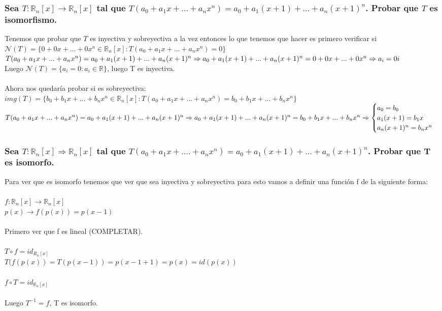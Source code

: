 \documentclass{article}
\begin{document}
\begin{enumerate}[a.]
\end{enumerate}

\subsubsection{Sea $T: \mathbb{R}_n[x] \rightarrow \mathbb{R}_n[x]$ tal que $T(a_0+a_1x+...+a_nx^n) = a_0 +
a_1(x+1)+...+a_n(x+1)^n$. Probar que $T$ es isomorfismo.}
Tenemos que probar que $T$ es inyectiva y sobreyectiva a la vez entonces lo que tenemos que hacer
es primero verificar si
\\
$\mathcal{N}(T) = \{ 0+0x+...+0x^n \in \mathbb{R}_n[x] : T(a_0+a_1x+...+a_nx^n) = 0 \}$ \\
$T(a_0+a_1x+...+a_nx^n) = a_0+a_1(x+1)+...+a_n(x+1)^n \Rightarrow a_0+a_1(x+1)+...+a_n(x+1)^n = 0+0x+...+0x^n
\\ \Rightarrow a_i = 0i$
\\ Luego $\mathcal{N}(T) = \{ a_i = 0 : a_i \in \mathbb{R} \}$, luego T es inyectiva. \\ 
\\ Ahora nos quedaría probar si es sobreyectiva: \\  
$img(T) = \{ b_0+b_1x+...+b_nx^n \in \mathbb{R}_n[x] : T(a_0+a_1x+...+a_nx^n) = b_0+b_1x+...+b_nx^n \}$
\\ $T(a_0+a_1x+...+a_nx^n) = a_0+a_1(x+1)+...+a_n(x+1)^n \Rightarrow
a_0 + a_1(x+1) + ... + a_n(x+1)^n =  b_0+b_1x+...+b_nx^n \\ \Rightarrow
\begin{cases} a_0 = b_0 \\ a_1(x+1) = b_1x \\ a_n(x+1)^n = b_nx^n \end{cases}$


\subsubsection{Sea $T:\mathbb{R}_n[x] \Rightarrow \mathbb{R}_n[x]$ tal que $T(a_0+a_1x+....+a_nx^n)
= a_0+a_1(x+1)+...+a_n(x+1)^n$. Probar que T es isomorfo.}
Para ver que es isomorfo tenemos que ver que sea inyectiva y sobreyectiva para esto
 vamos a definir una función f de la siguiente forma: \\ \\
$f: \mathbb{R}_n[x] \rightarrow \mathbb{R}_n[x]$ \\
$p(x) \rightarrow f(p(x)) = p(x-1)$
\\ \\ Primero ver que f es lineal (COMPLETAR).
\\ \\
$T \circ f = id_{R_n[x]}$
\\ $T(f(p(x)) = T(p(x-1)) = p(x-1+1) = p(x) = id(p(x)) $
\\ \\
$f \circ T = id_{\mathbb{R}_n[x]}$
\\ \\ Luego $T^{-1} = f$, T es isomorfo.
\end{document}
